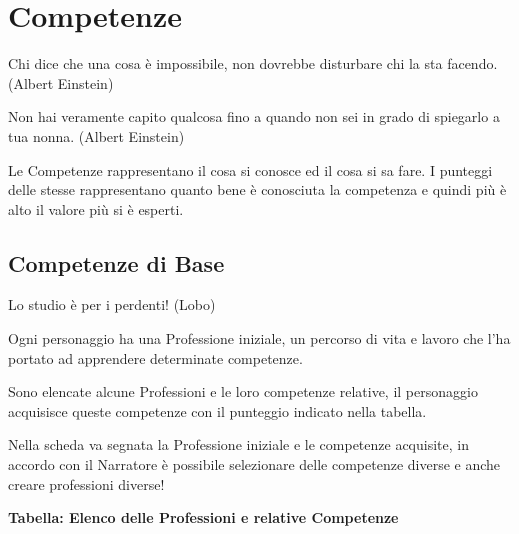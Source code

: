 \section{Competenze}

\begin{changemargin}{0.3cm}{0.3cm}\begin{enfasi}{
Chi dice che una cosa è impossibile, non dovrebbe disturbare chi la sta facendo. (Albert Einstein)

\medskip
Non hai veramente capito qualcosa fino a quando non sei in grado di spiegarlo a tua nonna. (Albert Einstein)}\end{enfasi}\end{changemargin}

\begin{multicols}{2}

Le Competenze rappresentano il cosa si conosce ed il cosa si sa fare. I punteggi delle stesse rappresentano quanto bene è conosciuta la competenza e quindi più è alto il valore più si è esperti.

\subsection{Competenze di Base}\label{competenzebase}

\begin{changemargin}{0.3cm}{0.3cm}\begin{enfasi}{
Lo studio è per i perdenti! (Lobo) }\end{enfasi}
\end{changemargin}

Ogni personaggio ha una Professione iniziale, un percorso di vita e lavoro che l'ha portato ad apprendere determinate competenze.

Sono elencate alcune Professioni e le loro competenze relative, il personaggio acquisisce queste competenze con il punteggio indicato nella tabella.

Nella scheda va segnata la Professione iniziale e le competenze acquisite, in accordo con il Narratore è possibile selezionare delle competenze diverse e anche creare professioni diverse!

\end{multicols}

\textbf{Tabella: Elenco delle Professioni e relative Competenze}

